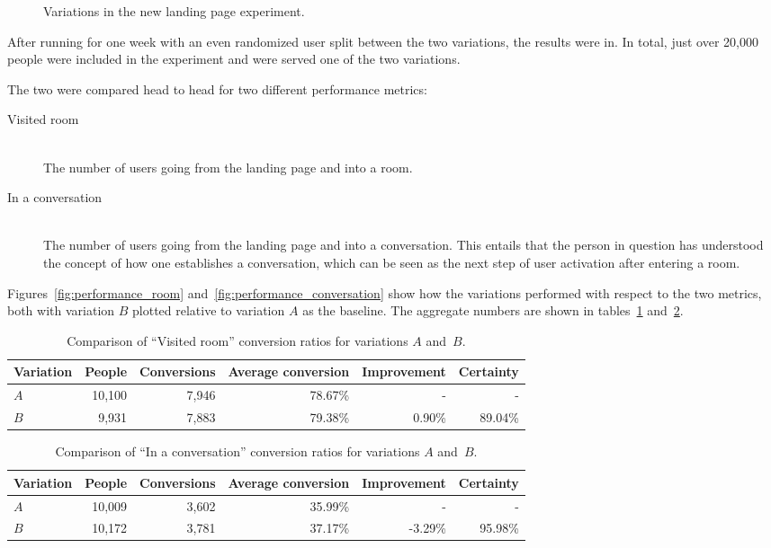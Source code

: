 \begin{figure}[h]
  \caption{Variations in the new landing page experiment.}
  \label{fig:variations}
\end{figure}

After running for one week with an even randomized user split between the two variations, the results were in. In total, just over 20,000 people were included in the experiment and were served one of the two variations.

The two were compared head to head for two different performance metrics:

\begin{description}
  \item[Visited room] \hfill \\
    The number of users going from the landing page and into a room.
  \item[In a conversation] \hfill \\
    The number of users going from the landing page and into a conversation. This entails that the person in question has understood the concept of how one establishes a conversation, which can be seen as the next step of user activation after entering a room.
\end{description}

Figures~\ref{fig:performance_room} and~\ref{fig:performance_conversation} show how the variations performed with respect to the two metrics, both with variation $B$ plotted relative to variation $A$ as the baseline.
The aggregate numbers are shown in tables~\ref{tab:performance_room} and~\ref{tab:performance_conversation}.

\begin{table}[h]
  \begin{tabular}{|l|r|r|r|r|r|}
    \hline
    Variation & People & Conversions & Average conversion & Improvement & Certainty \\ \hline
    $A$       & 10,100 & 7,946       & 78.67\%            & -           & -         \\ \hline
    $B$       &  9,931 & 7,883       & 79.38\%            & 0.90\%      & 89.04\%   \\ \hline
  \end{tabular}
  \caption{Comparison of ``Visited room'' conversion ratios for variations $A$ and~$B$.}
  \label{tab:performance_room}
\end{table}

\begin{table}[h]
  \begin{tabular}{|l|r|r|r|r|r|}
    \hline
    Variation & People & Conversions & Average conversion & Improvement & Certainty \\ \hline
    $A$       & 10,009 & 3,602       & 35.99\%            & -           & -         \\ \hline
    $B$       & 10,172 & 3,781       & 37.17\%            & -3.29\%     & 95.98\%   \\ \hline
  \end{tabular}
  \caption{Comparison of ``In a conversation'' conversion ratios for variations $A$ and~$B$.}
  \label{tab:performance_conversation}
\end{table}

